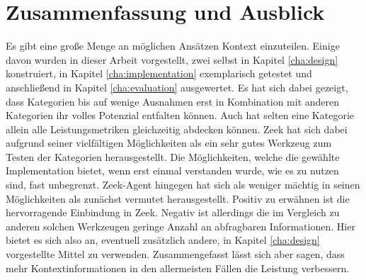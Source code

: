 \chapter{Zusammenfassung und Ausblick}%
\label{cha:conclusion}


Es gibt eine große Menge an möglichen Ansätzen Kontext einzuteilen. Einige davon wurden in dieser Arbeit vorgestellt, zwei selbst in Kapitel \ref{cha:design} konstruiert, in Kapitel \ref{cha:implementation} exemplarisch getestet und anschließend in Kapitel \ref{cha:evaluation} ausgewertet. Es hat sich dabei gezeigt, dass Kategorien bis auf wenige Ausnahmen erst in Kombination mit anderen Kategorien ihr volles Potenzial entfalten können. Auch hat selten eine Kategorie allein alle Leistungsmetriken gleichzeitig abdecken können. Zeek hat sich dabei aufgrund seiner vielfältigen Möglichkeiten als ein sehr gutes Werkzeug zum Testen der Kategorien herausgestellt. Die Möglichkeiten, welche die gewählte Implementation bietet, wenn erst einmal verstanden wurde, wie es zu nutzen sind, fast unbegrenzt. Zeek-Agent hingegen hat sich als weniger mächtig in seinen Möglichkeiten als zunächst vermutet herausgestellt. Positiv zu erwähnen ist die hervorragende Einbindung in Zeek. Negativ ist allerdings die im Vergleich zu anderen solchen Werkzeugen geringe Anzahl an abfragbaren Informationen. Hier bietet es sich also an, eventuell zusätzlich andere, in Kapitel \ref{cha:design} vorgestellte Mittel zu verwenden. Zusammengefasst lässt sich aber sagen, dass mehr Kontextinformationen in den allermeisten Fällen die Leistung verbessern.\newline
